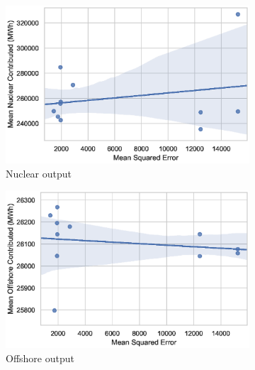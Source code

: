 \begin{figure}
\begin{subfigure}{0.3\textwidth}
		\includegraphics[width=\columnwidth]{Chapter5/figures/market-forecasting/results/elecsim_results/results_2/contributed_Nuclear_mean_output.eps}
		\caption{Nuclear output}
		\label{fig:contributed_Nuclear_mean_output}
	\end{subfigure}
	\medskip
	\begin{subfigure}{0.3\textwidth}   
		\includegraphics[width=\columnwidth]{Chapter5/figures/market-forecasting/results/elecsim_results/results_2/contributed_Offshore_mean_output.eps}
		\caption{Offshore output}
		\label{fig:contributed_Offshore_mean_output.eps}
	\end{subfigure}
	\hfil
	\begin{subfigure}{0.3\textwidth}   

\end{subfigure}
\end{figure}
